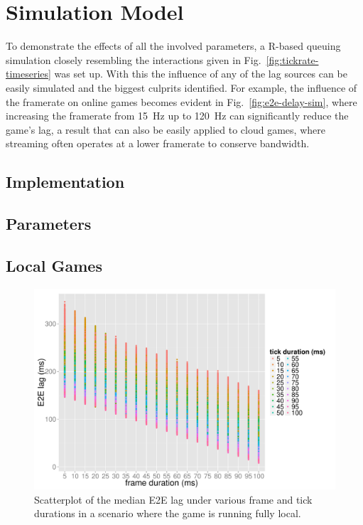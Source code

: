 \section{Simulation Model}
\label{sec:simulation}

To demonstrate the effects of all the involved parameters, a R-based queuing simulation closely resembling the interactions given in Fig.~\ref{fig:tickrate-timeseries} was set up. With this the influence of any of the lag sources can be easily simulated and the biggest culprits identified. For example, the influence of the framerate on online games becomes evident in Fig.~\ref{fig:e2e-delay-sim}, where increasing the framerate from \SI{15}{\hertz} up to \SI{120}{\hertz} can significantly reduce the game's lag, a result that can also be easily applied to cloud games, where streaming often operates at a lower framerate to conserve bandwidth.

\subsection{Implementation}

\subsection{Parameters}


\subsection{Local Games}

\begin{figure}[!t]
	\centering
	\includegraphics[width=1.0\columnwidth]{../simulation/visualization/nwless-onlinegame-1000rounds.pdf}
	\caption{Scatterplot of the median E2E lag under various frame and tick durations in a scenario where the game is running fully local.}
\label{fig:nwless-scatter}
\end{figure}


